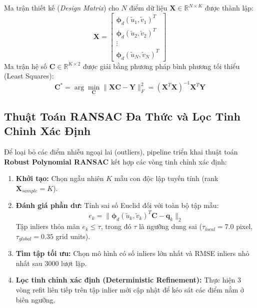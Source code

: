 \documentclass[11pt,a4paper]{article}
\begin{document}
Ma trận thiết kế (\textit{Design Matrix}) cho $N$ điểm dữ liệu $\mathbf{X} \in \mathbb{R}^{N \times K}$ được thành lập:
\begin{equation}
    \mathbf{X} = \begin{bmatrix}
        \bm{\phi}_d(\tilde{u}_1, \tilde{v}_1)^T \\
        \bm{\phi}_d(\tilde{u}_2, \tilde{v}_2)^T \\
        \vdots \\
        \bm{\phi}_d(\tilde{u}_N, \tilde{v}_N)^T
    \end{bmatrix}
\end{equation}
Ma trận hệ số $\mathbf{C} \in \mathbb{R}^{K \times 2}$ được giải bằng phương pháp bình phương tối thiểu (Least Squares):
\begin{equation}
    \mathbf{C}^* = \arg\min_{\mathbf{C}} \|\mathbf{X}\mathbf{C} - \mathbf{Y}\|_F^2 = (\mathbf{X}^T \mathbf{X})^{-1} \mathbf{X}^T \mathbf{Y}
\end{equation}

\subsection{Thuật Toán RANSAC Đa Thức và Lọc Tinh Chỉnh Xác Định}
Để loại bỏ các điểm nhiễu ngoại lai (outliers), pipeline triển khai thuật toán \textbf{Robust Polynomial RANSAC} kết hợp các vòng tinh chỉnh xác định:
\begin{enumerate}
    \item \textbf{Khởi tạo:} Chọn ngẫu nhiên $K$ mẫu con độc lập tuyến tính (rank $\mathbf{X}_{sample} = K$).
    \item \textbf{Đánh giá phần dư:} Tính sai số Euclid đối với toàn bộ tập mẫu:
    \begin{equation}
        e_k = \|\bm{\phi}_d(\tilde{u}_k, \tilde{v}_k)^T \mathbf{C} - \mathbf{q}_k\|_2
    \end{equation}
    Tập inliers thỏa mãn $e_k \le \tau$, trong đó $\tau$ là ngưỡng dung sai ($\tau_{local} = 7.0$ pixel, $\tau_{global} = 0.35$ grid units).
    \item \textbf{Tìm tập tối ưu:} Chọn mô hình có số inliers lớn nhất và RMSE inliers nhỏ nhất sau 3000 lượt lặp.
    \item \textbf{Lọc tinh chỉnh xác định (Deterministic Refinement):} Thực hiện 3 vòng refit liên tiếp trên tập inlier mới cập nhật để kéo sát các điểm nằm ở biên ngưỡng.
\end{enumerate}
\end{document}
